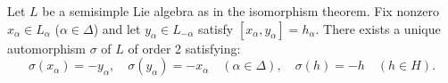 Let $L$ be a semisimple Lie algebra as in the isomorphism theorem. Fix nonzero $x_\alpha \in L_\alpha$ ($\alpha \in \Delta$) and let $y_\alpha \in L_{-\alpha}$ satisfy $[x_\alpha, y_\alpha] = h_\alpha$. There exists a unique automorphism $\sigma$ of $L$ of order 2 satisfying:
$$\sigma(x_\alpha) = -y_\alpha, \quad \sigma(y_\alpha) = -x_\alpha \quad (\alpha \in \Delta), \quad \sigma(h) = -h \quad (h \in H).$$
